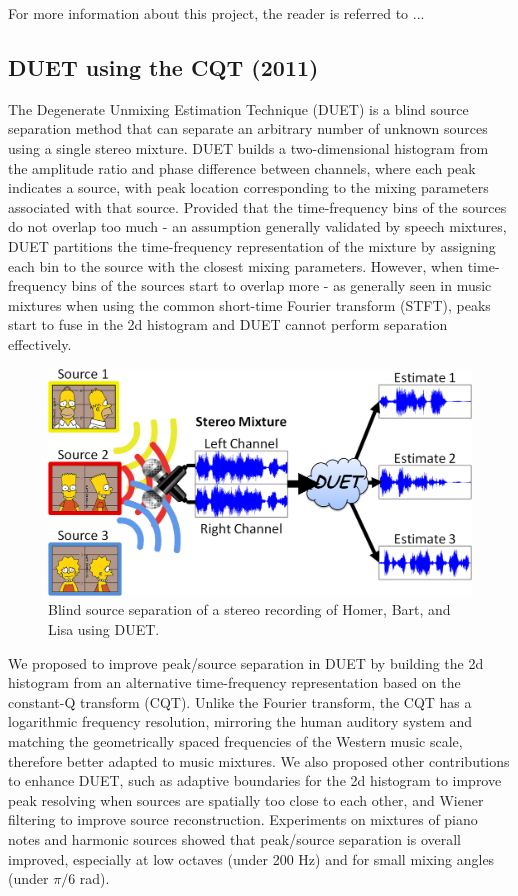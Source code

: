 \documentclass{article}
\begin{document}
For more information about this project, the reader is referred to ...


\subsection{DUET using the CQT (2011)}
\label{ssec:duet}

The Degenerate Unmixing Estimation Technique (DUET) is a blind source separation method that can separate an arbitrary number of unknown sources using a single stereo mixture. DUET builds a two-dimensional histogram from the amplitude ratio and phase difference between channels, where each peak indicates a source, with peak location corresponding to the mixing parameters associated with that source. Provided that the time-frequency bins of the sources do not overlap too much - an assumption generally validated by speech mixtures, DUET partitions the time-frequency representation of the mixture by assigning each bin to the source with the closest mixing parameters. However, when time-frequency bins of the sources start to overlap more - as generally seen in music mixtures when using the common short-time Fourier transform (STFT), peaks start to fuse in the 2d histogram and DUET cannot perform separation effectively.

\begin{figure}[htb]
\centering
\includegraphics[width=\columnwidth]{Images/duet.png}
\caption{Blind source separation of a stereo recording of Homer, Bart, and Lisa using DUET.}
\label{fig:duet}
\end{figure}

We proposed to improve peak/source separation in DUET by building the 2d histogram from an alternative time-frequency representation based on the constant-Q transform (CQT). Unlike the Fourier transform, the CQT has a logarithmic frequency resolution, mirroring the human auditory system and matching the geometrically spaced frequencies of the Western music scale, therefore better adapted to music mixtures. We also proposed other contributions to enhance DUET, such as adaptive boundaries for the 2d histogram to improve peak resolving when sources are spatially too close to each other, and Wiener filtering to improve source reconstruction. Experiments on mixtures of piano notes and harmonic sources showed that peak/source separation is overall improved, especially at low octaves (under 200 Hz) and for small mixing angles (under ${\pi}/{6}$ rad).
\end{document}
